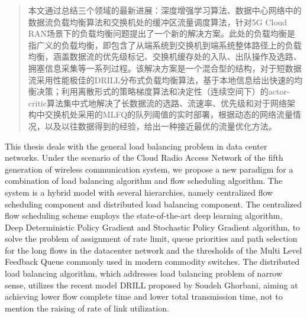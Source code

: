 
\begin{abstract}
本文通过总结三个领域的最新进展：深度增强学习算法、数据中心网络中的数据流负载均衡算法和交换机处的缓冲区流量调度算法，针对5G Cloud RAN场景下的负载均衡问题提出了一个新的解决方案。此处的负载均衡是指广义的负载均衡，即包含了从端系统到交换机到端系统整体路径上的负载均衡，涵盖数据流的优先级标记、交换机缓存处的入队、出队操作及选路、拥塞信息采集等一系列过程。该解决方案是一个混合型的结构，对于短数据流采用性能极佳的DRILL分布式负载均衡算法，基于本地信息给出快速的均衡决策；利用离散形式的策略梯度算法和决定性（连续空间下）的actor-critic算法集中式地解决了长数据流的选路、流速率、优先级和对于网络架构中交换机处采用的MLFQ的队列阈值的实时部署，根据动态的网络流量情况，以及以往数据得到的经验，给出一种接近最优的流量优化方法。

\end{abstract}

\begin{englishabstract}

This thesis deals with the general load balancing problem in data center networks. Under the scenario of the Cloud Radio Access Network of the fifth generation of wireless communication system, we propose a new paradigm for a combination of load balancing algorithm and flow scheduling algorithm. The system is a hybrid model with several hierarchies, namely centralized flow scheduling component and distributed load balancing component. The centralized flow scheduling scheme employs the state-of-the-art deep learning algorithm, Deep Deterministic Policy Gradient and Stochastic Policy Gradient algorithm, to solve the problem of assignment of rate limit, queue priorities and path selection for the long flows in the datacenter network and the thresholds of the Multi Level Feedback Queue commonly used in modern commodity switches. The distributed load balancing algorithm, which addresses load balancing problem of narrow sense, utilizes the recent model DRILL proposed by Soudeh Ghorbani, aiming at achieving lower flow complete time and lower total transmission time, not to mention the raising of rate of link utilization.

\end{englishabstract}

